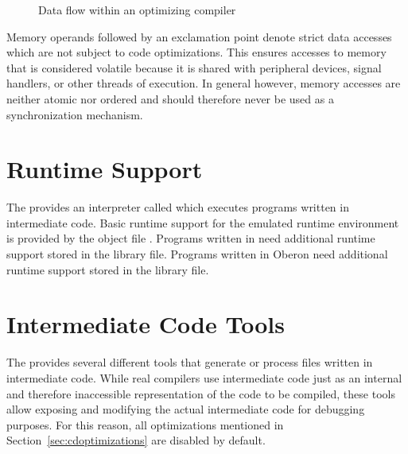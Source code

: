 \begin{figure}
\caption{Data flow within an optimizing compiler}
\label{fig:cdoptdataflow}
\end{figure}

Memory operands followed by an exclamation point denote strict data accesses which are not subject to code optimizations.
This ensures accesses to memory that is considered volatile because it is shared with peripheral devices, signal handlers, or other threads of execution.
In general however, memory accesses are neither atomic nor ordered and should therefore never be used as a synchronization mechanism.

\section{Runtime Support}

The \ecs{} provides an interpreter called  which executes programs written in intermediate code.
Basic runtime support for the emulated runtime environment is provided by the object file .
Programs written in \cpp{} need additional runtime support stored in the  library file.
Programs written in Oberon need additional runtime support stored in the  library file.
\seecpp\seeoberon

\section{Intermediate Code Tools}\label{sec:cdtools}

The \ecs{} provides several different tools that generate or process files written in intermediate code.
While real compilers use intermediate code just as an internal and therefore inaccessible representation of the code to be compiled,
these tools allow exposing and modifying the actual intermediate code for debugging purposes.
For this reason, all optimizations mentioned in Section~\ref{sec:cdoptimizations} are disabled by default.
\interface\renewcommand{\debuggingtool}{}

\cdcheck
\cdopt
\cdrun
\cdamda
\cdamdb
\cdamdc
\cdarma
\cdarmb
\cdarmc
\cdarmcfpe
\cdavr
\cdavrtt
\cdmabk
\cdmibl
\cdmipsa
\cdmipsb
\cdmmix
\cdorok
\cdppca
\cdppcb
\cdrisc
\cdwasm
\cppcode
\falcode
\obcode

\concludechapter
